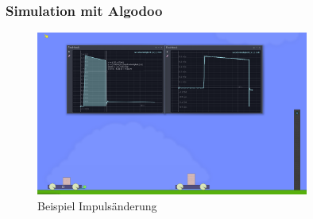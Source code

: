 \documentclass{article}
\begin{document}
\frame
{
  \frametitle{Simulation mit Algodoo}
      \begin{figure}
	  \includegraphics[width=0.8\textwidth]{Algodoo}
	  \vspace{-3mm}
	  \caption{Beispiel Impulsänderung}
   \end{figure}
}
\end{document}
